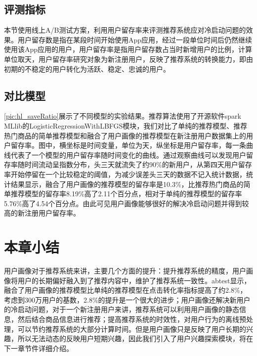     \subsection{评测指标}
    本节使用线上A/B测试方案\citep{ab-test}，利用用户留存率来评测推荐系统应对冷启动问题的效果。用户留存数是指在某段时间开始使用App应用，经过一段单位时间后仍然继续使用该App应用的用户，用户留存率是指用户留存数占当时新增用户的比例，计算单位取天，用户留存率研究对象为新注册用户，反映了推荐系统的转换能力，即由初期的不稳定的用户转化为活跃、稳定、忠诚的用户。
    \subsection{对比模型}
    \autoref{pic:hl_saveRatio}展示了不同模型的实验结果。推荐算法使用了开源软件spark MLlib的LogisticRegressionWithLBFGS模块，我们对比了单纯的推荐模型、推荐热门商品的简单推荐模型和融合了用户画像的推荐模型在新注册用户数据集上的用户留存率。图中，横坐标是时间变量，单位为天，纵坐标是用户留存率，每一条曲线代表了一个模型的用户留存率随时间变化的曲线。通过观察曲线可以发现用户留存率随时间流动呈指数分布，头三天就流失了约90\%的新用户，从第四天用户留存率开始停留在一个比较稳定的阈值，为减少误差头三天的数据不记入统计数据，统计结果显示，融合了用户画像的推荐模型的留存率是10.3\%，比推荐热门商品的简单推荐模型的留存率8.19\%高了2.11个百分点，相对于单纯的推荐模型的留存率5.76\%高了4.54个百分点。由此可见用户画像能够很好的解决冷启动问题并得到较高的新注册用户留存率。
    \begin{figure}
    \centering
      \label{pic:hl_saveRatio}
    \end{figure}

  \section{本章小结}
    用户画像对于推荐系统来讲，主要几个方面的提升：提升推荐系统的精度，用户画像将用户的长期偏好融入到了推荐内容中，维护了推荐系统一致性。abtest显示，融合了用户画像的推荐模型比单纯的推荐模型在点击转化率指标提高了约2.8\%，考虑到300万用户的基数，2.8\%的提升是一个很大的进步；用户画像还解决新用户的冷启动问题，对于一个新注册用户来讲，推荐系统可以利用用户画像的静态信息，然后结合商品信息进行推荐；提高推荐系统的时效性，对用户行为的离线预处理，可以节约推荐系统的大部分计算时间。但是用户画像只是反映了用户长期的兴趣，所以无法动态的反映用户短期兴趣，因此我们引入了用户兴趣探索模块，将在下一章节件详细介绍。
